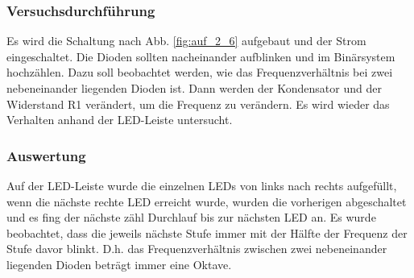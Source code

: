 \documentclass[12pt,a4paper]{article}
\begin{document}
\subsubsection*{Versuchsdurchführung}
Es wird die Schaltung nach Abb. \ref{fig:auf_2_6} aufgebaut und der Strom eingeschaltet. Die Dioden sollten nacheinander aufblinken und im Binärsystem hochzählen. Dazu soll beobachtet werden, wie das Frequenzverhältnis bei zwei nebeneinander liegenden Dioden ist. Dann werden der Kondensator und der Widerstand R1 verändert, um die Frequenz zu verändern. Es wird wieder das Verhalten anhand der LED-Leiste untersucht.
\subsubsection*{Auswertung}
Auf der LED-Leiste wurde die einzelnen LEDs von links nach rechts aufgefüllt, wenn die nächste rechte LED erreicht wurde, wurden die vorherigen abgeschaltet und es fing der nächste zähl Durchlauf bis zur nächsten LED an.
Es wurde beobachtet, dass die jeweils nächste Stufe immer mit der Hälfte der Frequenz der Stufe davor blinkt. D.h. das Frequenzverhältnis zwischen zwei nebeneinander liegenden Dioden beträgt immer eine Oktave.
\end{document}
